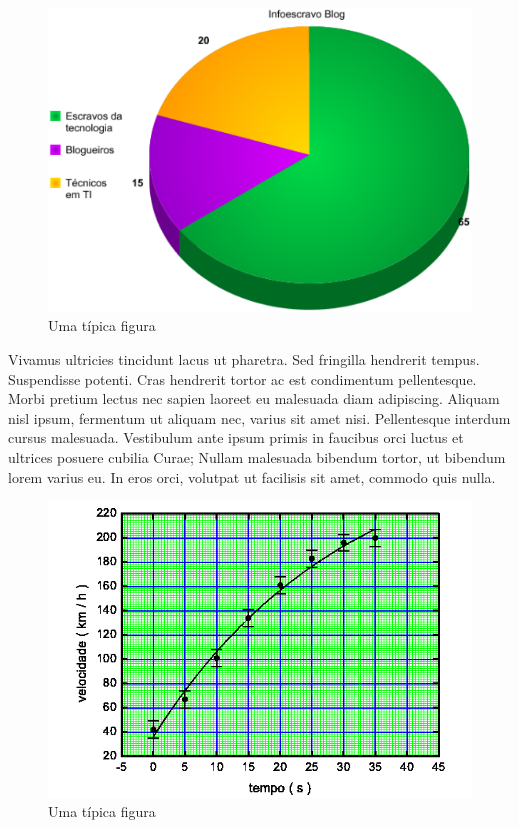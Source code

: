 \begin{figure}[!htp]
\centering
\includegraphics[scale = .5]{graficos-online-gratis.png}
\caption{Uma típica figura}
\end{figure}


Vivamus ultricies tincidunt lacus ut pharetra. Sed fringilla hendrerit tempus. Suspendisse potenti. Cras hendrerit tortor ac est condimentum pellentesque. Morbi pretium lectus nec sapien laoreet eu malesuada diam adipiscing. Aliquam nisl ipsum, fermentum ut aliquam nec, varius sit amet nisi. Pellentesque interdum cursus malesuada. Vestibulum ante ipsum primis in faucibus orci luctus et ultrices posuere cubilia Curae; Nullam malesuada bibendum tortor, ut bibendum lorem varius eu. In eros orci, volutpat ut facilisis sit amet, commodo quis nulla.


\begin{figure}[!htp]
\centering
\includegraphics[scale = .5]{graf-fig1.png}
\caption{Uma típica figura}
\end{figure}



